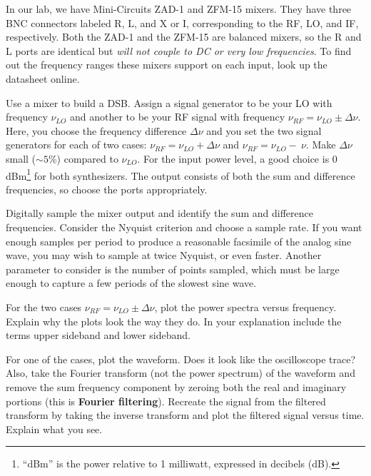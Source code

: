 \documentclass[11pt,preprint]{aastex}
\begin{document}
In our lab, we have Mini-Circuits ZAD-1 and ZFM-15 mixers. 
They have three BNC connectors
labeled R, L, and X or I, corresponding to
the RF, LO, and IF, respectively.
Both the ZAD-1 and the ZFM-15 are
balanced mixers, so the R and L ports are identical but
{\it will not couple to DC or very low frequencies}.  To find out
the frequency ranges these mixers support on each input, 
look up the datasheet online. 


Use a mixer to build a DSB.
Assign a signal generator to
be your LO with frequency $\nu_{LO}$ and
another to be your RF signal with frequency $\nu_{RF} = \nu_{LO} \pm
\Delta \nu$.  Here, you choose the frequency difference $\Delta \nu$ and
you set the two signal generators 
for each of two cases:
$\nu_{RF} = \nu_{LO} + \Delta \nu$ and $\nu_{RF} = \nu_{LO} - \
\nu$.  Make $\Delta \nu$ small ($\sim5$\%) compared to $\nu_{LO}$.
For the input power level, a good choice is 0
dBm\footnote{``dBm'' is the power relative to 1 milliwatt, expressed in decibels (dB).}
for both synthesizers. The output consists of both the
sum and difference frequencies, so choose the ports appropriately.

Digitally sample the mixer output and identify the
sum and difference frequencies.
Consider
the Nyquist criterion and choose a sample rate. If you want enough samples per period to
produce a reasonable facsimile of the analog sine wave,
you may wish to sample at twice
Nyquist, or even faster.  Another parameter to consider is the number of points
sampled, which must be large enough to capture a few
periods of the slowest sine wave.

For the two cases $\nu_{RF} = \nu_{LO} \pm \Delta \nu$, plot the power
spectra versus frequency. Explain why the plots look the way they do. In
your explanation include the terms upper sideband and lower
sideband.

For one of the cases, plot the waveform.  Does it look like the
oscilloscope trace? Also, take the Fourier transform (not the power
spectrum) of the waveform and remove the sum frequency component by
zeroing both the real and imaginary portions (this is {\bf Fourier
filtering}).  Recreate the signal from the filtered transform by taking
the inverse transform and plot the filtered signal versus time.  Explain
what you see.
\end{document}
